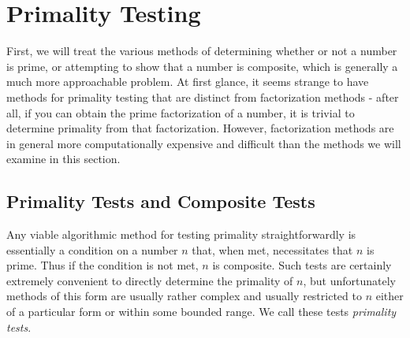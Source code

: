 \documentclass{article}
\begin{document}
\newpage



\section{ Primality Testing }

\par First, we will treat the various methods of determining whether or not a number is prime, or attempting to show that a number is composite, which is generally a much more approachable problem. At first glance, it seems strange to have methods for primality testing that are distinct from factorization methods - after all, if you can obtain the prime factorization of a number, it is trivial to determine primality from that factorization. However, factorization methods are in general more computationally expensive and difficult than the methods we will examine in this section. 


\subsection*{ Primality Tests and Composite Tests }

\par Any viable algorithmic method for testing primality straightforwardly is essentially a condition on a number $n$ that, when met, necessitates that $n$ is prime. Thus if the condition is not met, $n$ is composite. Such tests are certainly extremely convenient to directly determine the primality of $n$, but unfortunately methods of this form are usually rather complex and usually restricted to $n$ either of a particular form or within some bounded range. We call these tests \textit{primality tests}.
\end{document}
